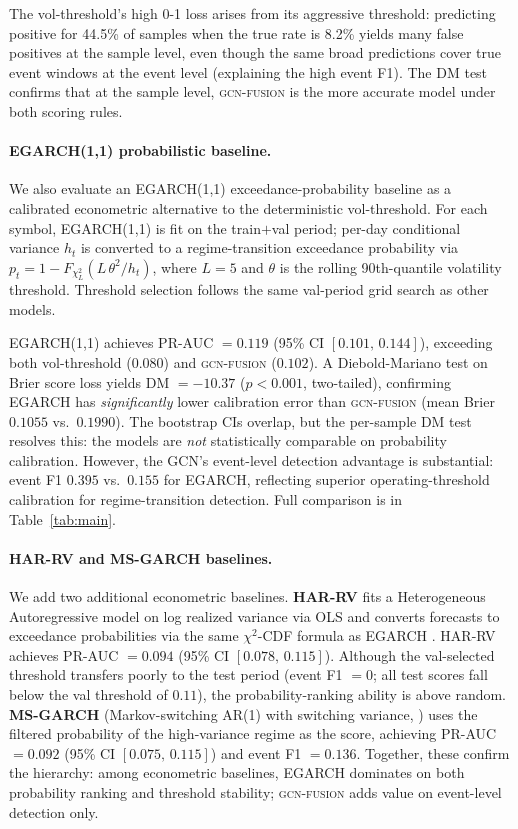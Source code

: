 \documentclass[sigconf]{acmart}
\begin{document}
\noindent The vol-threshold's high 0-1 loss arises from its aggressive threshold:
predicting positive for 44.5\% of samples when the true rate is 8.2\% yields
many false positives at the sample level, even though the same broad predictions
cover true event windows at the event level (explaining the high event F1).
The DM test confirms that at the sample level, \textsc{gcn-fusion} is
the more accurate model under both scoring rules.

\paragraph{EGARCH(1,1) probabilistic baseline.}
We also evaluate an EGARCH(1,1) exceedance-probability baseline as a
calibrated econometric alternative to the deterministic vol-threshold.
For each symbol, EGARCH(1,1) is fit on the train$+$val period; per-day
conditional variance $h_t$ is converted to a regime-transition exceedance
probability via $p_t = 1 - F_{\chi^2_L}(L\,\theta^2 / h_t)$, where
$L{=}5$ and $\theta$ is the rolling 90th-quantile volatility threshold.
Threshold selection follows the same val-period grid search as other models.

EGARCH(1,1) achieves PR-AUC $= 0.119$ (95\% CI $[0.101,\, 0.144]$), exceeding
both vol-threshold ($0.080$) and \textsc{gcn-fusion} ($0.102$).
A Diebold-Mariano test on Brier score loss yields DM $= {-}10.37$
($p{<}0.001$, two-tailed), confirming EGARCH has \emph{significantly} lower
calibration error than \textsc{gcn-fusion} (mean Brier $0.1055$ vs.\ $0.1990$).
The bootstrap CIs overlap, but the per-sample DM test resolves this:
the models are \emph{not} statistically comparable on probability calibration.
However, the GCN's event-level detection advantage is substantial:
event F1 $0.395$ vs.\ $0.155$ for EGARCH, reflecting superior
operating-threshold calibration for regime-transition detection.
Full comparison is in Table~\ref{tab:main}.

\paragraph{HAR-RV and MS-GARCH baselines.}
We add two additional econometric baselines.
\textbf{HAR-RV} \cite{corsi2009} fits a Heterogeneous Autoregressive model on
log realized variance via OLS and converts forecasts to exceedance probabilities
via the same $\chi^2$-CDF formula as EGARCH \cite{andersen2003}.
HAR-RV achieves PR-AUC $= 0.094$ (95\% CI $[0.078,\, 0.115]$).
Although the val-selected threshold transfers poorly to the test period
(event F1 $= 0$; all test scores fall below the val threshold of $0.11$),
the probability-ranking ability is above random.
\textbf{MS-GARCH} (Markov-switching AR(1) with switching variance,
\citealt{hamilton1989}) uses the filtered probability of the high-variance
regime as the score, achieving PR-AUC $= 0.092$ (95\% CI $[0.075,\, 0.115]$)
and event F1 $= 0.136$.
Together, these confirm the hierarchy: among econometric baselines, EGARCH
dominates on both probability ranking and threshold stability;
\textsc{gcn-fusion} adds value on event-level detection only.
\end{document}
